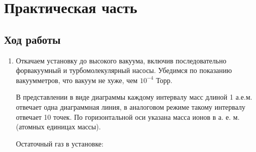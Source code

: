 \documentclass[a4paper, 12pt]{article}
\begin{document}
	\section{Практическая часть}
	\subsection{Ход работы}
	\begin{enumerate}
		\item Откачаем установку до высокого вакуума, включив последовательно форвакуумный и турбомолекулярный насосы. Убедимся по показанию вакуумметров, что вакуум не хуже, чем $10^{-4}$ Торр.\par
			В представлении в виде диаграммы каждому интервалу масс длиной 1 а.е.м. отвечает одна диаграммная линия, в аналоговом режиме такому интервалу отвечает 10 точек. По горизонтальной оси указана масса ионов в а. е. м. (атомных единицах массы).\par
			Остаточный газ в установке:
			
	\end{enumerate}
\end{document}
